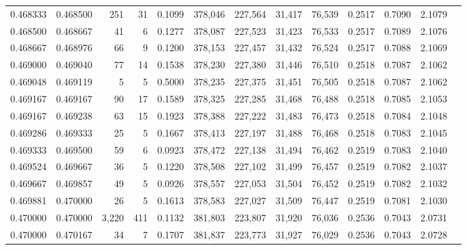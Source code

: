 \begin{tabular}{rrrrrrrrrrrrr}
0.468333 & 0.468500 &   251 &  31 &                                     0.1099 & 378,046 & 227,564 &  31,417 &  76,539 & 0.2517 & 0.7090 & 2.1079 \\
0.468500 & 0.468667 &    41 &   6 &                                     0.1277 & 378,087 & 227,523 &  31,423 &  76,533 & 0.2517 & 0.7089 & 2.1076 \\
0.468667 & 0.468976 &    66 &   9 &                                     0.1200 & 378,153 & 227,457 &  31,432 &  76,524 & 0.2517 & 0.7088 & 2.1069 \\
0.469000 & 0.469040 &    77 &  14 &                                     0.1538 & 378,230 & 227,380 &  31,446 &  76,510 & 0.2518 & 0.7087 & 2.1062 \\
0.469048 & 0.469119 &     5 &   5 &                                     0.5000 & 378,235 & 227,375 &  31,451 &  76,505 & 0.2518 & 0.7087 & 2.1062 \\
0.469167 & 0.469167 &    90 &  17 &                                     0.1589 & 378,325 & 227,285 &  31,468 &  76,488 & 0.2518 & 0.7085 & 2.1053 \\
0.469167 & 0.469238 &    63 &  15 &                                     0.1923 & 378,388 & 227,222 &  31,483 &  76,473 & 0.2518 & 0.7084 & 2.1048 \\
0.469286 & 0.469333 &    25 &   5 &                                     0.1667 & 378,413 & 227,197 &  31,488 &  76,468 & 0.2518 & 0.7083 & 2.1045 \\
0.469333 & 0.469500 &    59 &   6 &                                     0.0923 & 378,472 & 227,138 &  31,494 &  76,462 & 0.2519 & 0.7083 & 2.1040 \\
0.469524 & 0.469667 &    36 &   5 &                                     0.1220 & 378,508 & 227,102 &  31,499 &  76,457 & 0.2519 & 0.7082 & 2.1037 \\
0.469667 & 0.469857 &    49 &   5 &                                     0.0926 & 378,557 & 227,053 &  31,504 &  76,452 & 0.2519 & 0.7082 & 2.1032 \\
0.469881 & 0.470000 &    26 &   5 &                                     0.1613 & 378,583 & 227,027 &  31,509 &  76,447 & 0.2519 & 0.7081 & 2.1030 \\
0.470000 & 0.470000 & 3,220 & 411 &                                     0.1132 & 381,803 & 223,807 &  31,920 &  76,036 & 0.2536 & 0.7043 & 2.0731 \\
0.470000 & 0.470167 &    34 &   7 &                                     0.1707 & 381,837 & 223,773 &  31,927 &  76,029 & 0.2536 & 0.7043 & 2.0728 \\

\end{tabular}
